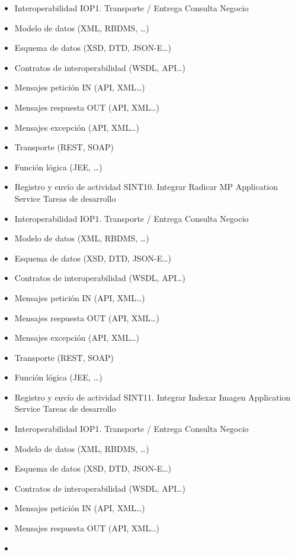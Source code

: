 \documentclass[
  paper=a4,
  ,captions=tableheading
]{scrartcl}
\begin{document}
\begin{itemize}
\item
  Interoperabilidad IOP1. Transporte / Entrega Consulta Negocio
\item
  Modelo de datos (XML, RBDMS, \ldots)
\item
  Esquema de datos (XSD, DTD, JSON-E\ldots)
\item
  Contratos de interoperabilidad (WSDL, API\ldots)
\item
  Mensajes petición IN (API, XML\ldots)
\item
  Mensajes respuesta OUT (API, XML\ldots)
\item
  Mensajes excepción (API, XML\ldots)
\item
  Transporte (REST, SOAP)
\item
  Función lógica (JEE, \ldots)
\item
  Registro y envío de actividad \textbar{} \textbar{} SINT10. Integrar
  Radicar MP \textbar{} Application Service \textbar{} Tareas de
  desarrollo
\item
  Interoperabilidad IOP1. Transporte / Entrega Consulta Negocio
\item
  Modelo de datos (XML, RBDMS, \ldots)
\item
  Esquema de datos (XSD, DTD, JSON-E\ldots)
\item
  Contratos de interoperabilidad (WSDL, API\ldots)
\item
  Mensajes petición IN (API, XML\ldots)
\item
  Mensajes respuesta OUT (API, XML\ldots)
\item
  Mensajes excepción (API, XML\ldots)
\item
  Transporte (REST, SOAP)
\item
  Función lógica (JEE, \ldots)
\item
  Registro y envío de actividad \textbar{} \textbar{} SINT11. Integrar
  Indexar Imagen \textbar{} Application Service \textbar{} Tareas de
  desarrollo
\item
  Interoperabilidad IOP1. Transporte / Entrega Consulta Negocio
\item
  Modelo de datos (XML, RBDMS, \ldots)
\item
  Esquema de datos (XSD, DTD, JSON-E\ldots)
\item
  Contratos de interoperabilidad (WSDL, API\ldots)
\item
  Mensajes petición IN (API, XML\ldots)
\item
  Mensajes respuesta OUT (API, XML\ldots)
\item

\end{itemize}
\end{document}
